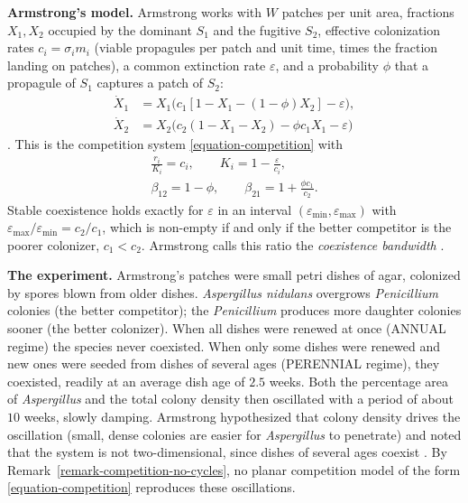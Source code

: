 \textbf{Armstrong's model.}
Armstrong works with $W$ patches per unit
area, fractions $X_1, X_2$ occupied by the
dominant $S_1$ and the fugitive $S_2$,
effective colonization rates
$c_i = \sigma_i m_i$ (viable propagules per
patch and unit time, times the fraction
landing on patches), a common extinction
rate $\varepsilon$, and a probability
$\phi$ that a propagule of $S_1$ captures a
patch of $S_2$:
$$
\begin{aligned}
\dot X_1 &= X_1\bigl(c_1
[1-X_1-(1-\phi)X_2] - \varepsilon\bigr),\\
\dot X_2 &= X_2\bigl(c_2(1-X_1-X_2)
- \phi c_1 X_1 - \varepsilon\bigr)
\end{aligned}
$$
\cite[equations 1a,
1b]{armstrong1976fugitive}.
This is the competition system
\eqref{equation-competition} with
$$
\begin{gathered}
\frac{r_i}{K_i} = c_i,
\qquad
K_i = 1-\frac{\varepsilon}{c_i},\\
\beta_{12} = 1-\phi,
\qquad
\beta_{21} = 1+\frac{\phi c_1}{c_2}.
\end{gathered}
$$
Stable coexistence holds exactly for
$\varepsilon$ in an interval
$(\varepsilon_{\min},\varepsilon_{\max})$
with
$\varepsilon_{\max}/\varepsilon_{\min}
= c_2/c_1$, which is non-empty if and only
if the better competitor is the poorer
colonizer, $c_1<c_2$. Armstrong calls this
ratio the \emph{coexistence bandwidth}
\cite{armstrong1976fugitive}.

\textbf{The experiment.}
Armstrong's patches were small petri dishes
of agar, colonized by spores blown from
older dishes. \emph{Aspergillus nidulans}
overgrows \emph{Penicillium} colonies (the
better competitor); the \emph{Penicillium}
produces more daughter colonies sooner (the
better colonizer). When all dishes were
renewed at once (ANNUAL regime) the species
never coexisted. When only some dishes were
renewed and new ones were seeded from dishes
of several ages (PERENNIAL regime), they
coexisted, readily at an average dish age
of $2.5$ weeks. Both the percentage area of
\emph{Aspergillus} and the total colony
density then oscillated with a period of
about $10$ weeks, slowly damping.
Armstrong hypothesized that colony density
drives the oscillation (small, dense
colonies are easier for \emph{Aspergillus}
to penetrate) and noted that the system is
not two-dimensional, since dishes of several
ages coexist
\cite{armstrong1976fugitive}. By
Remark~\ref{remark-competition-no-cycles},
no planar competition model of the form
\eqref{equation-competition} reproduces
these oscillations.

